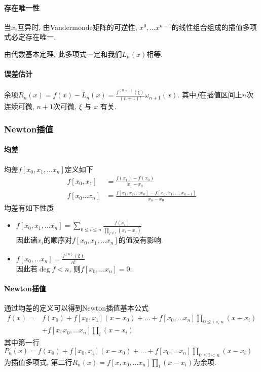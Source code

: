 \documentclass{ctexart}
\begin{document}
\paragraph{存在唯一性}
    当$x_i$互异时, 由Vandermonde矩阵的可逆性,
    $x^0,\ldots x^{n-1}$的线性组合组成的插值多项式必定存在唯一.\par
    由代数基本定理, 此多项式一定和我们$L_n(x)$相等.
\paragraph{误差估计}
    余项$R_n(x) = f(x) - L_n(x) = \frac{f^{(n+1)}(\xi)}{(n+1)!} \omega_{n+1}(x)$.
    其中$f$在插值区间上$n$次连续可微, $n+1$次可微, $\xi$ 与 $x$ 有关.
\subsubsection{Newton插值}
\paragraph{均差}
    均差$f[x_0, x_1, \ldots x_n]$定义如下 \begin{align*}
        f[x_0, x_1] &= \frac{f(x_1) - f(x_0)}{x_1 - x_0}\\
        f[x_0\ldots x_n] &=\frac{f[x_1,x_2,\ldots x_n] - f[x_0,x_1,\ldots,x_{n-1}]}{x_n-x_0}
    \end{align*}
    均差有如下性质\begin{itemize}
        \item $f[x_0,x_1,\ldots x_n] = \sum_{0\le i\le n} \frac{f(x_i)}{\prod_{j\neq i} (x_i-x_j)}$\\
            因此诸$x_i$的顺序对$f[x_0,x_1,\ldots x_n]$的值没有影响.
        \item $f[x_0,\ldots x_n] = \frac{f^{(n)}(\xi)}{n!}$\\
            因此若$\deg f < n$, 则$f[x_0,\ldots x_n] = 0$.
    \end{itemize}
\paragraph{Newton插值}
    通过均差的定义可以得到Newton插值基本公式 \begin{align*}
    f(x) =& f(x_0) + f[x_0,x_1] (x-x_0) + \ldots
        + f[x_0,\ldots x_n] \prod_{0\le i<n}(x-x_i) \\
        &+ f[x, x_0,\ldots x_n] \prod_i (x-x_i)
    \end{align*}
    其中第一行$P_n(x) = f(x_0) + f[x_0,x_1] (x-x_0) + \ldots
        + f[x_0,\ldots x_n] \prod_{0\le i<n}(x-x_i)$为插值多项式,
    第二行$R_n(x) = f[x, x_0,\ldots x_n] \prod_i (x-x_i)$为余项.
\end{document}
